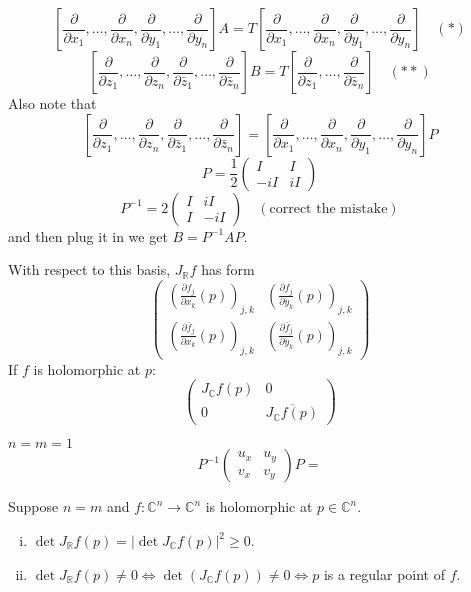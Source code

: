 \documentclass{article}
\begin{document}
$$
\left[ \frac{\partial}{\partial x_1}, \ldots, \frac{\partial}{\partial x_n}, \frac{\partial}{\partial y_1}, \ldots, \frac{\partial}{\partial y_n} \right] A = T \left[ \frac{\partial}{\partial x_1}, \ldots, \frac{\partial}{\partial x_n}, \frac{\partial}{\partial y_1}, \ldots, \frac{\partial}{\partial y_n} \right] \quad (\ast)
$$
$$
\left[ \frac{\partial}{\partial z_1}, \ldots, \frac{\partial}{\partial z_n}, \frac{\partial}{\partial \bar{z}_1}, \ldots, \frac{\partial}{\partial \bar{z}_n} \right] B = T \left[ \frac{\partial}{\partial z_1}, \ldots, \frac{\partial}{\partial \bar{z}_n} \right] \quad (\ast\ast)
$$
Also note that
$$
\left[ \frac{\partial}{\partial z_1}, \ldots, \frac{\partial}{\partial z_n}, \frac{\partial}{\partial \bar{z}_1}, \ldots, \frac{\partial}{\partial \bar{z}_n} \right] = \left[ \frac{\partial}{\partial x_1}, \ldots, \frac{\partial}{\partial x_n}, \frac{\partial}{\partial y_1}, \ldots, \frac{\partial}{\partial y_n} \right] P
$$
$$
P = \frac{1}{2} \begin{pmatrix}
I & I \\
-iI & iI
\end{pmatrix}
$$
$$
P^{-1} = 2 \begin{pmatrix}
I & iI \\
I & -iI
\end{pmatrix} \quad (\text{correct the mistake})
$$
and then plug it in we get $B = P^{-1} A P$.

With respect to this basis, $J_{\mathbb{R}} f$ has form
$$
\begin{pmatrix}
\left( \frac{\partial f_j}{\partial x_k} (p) \right)_{j, k} & \left( \frac{\partial f_j}{\partial y_k} (p) \right)_{j, k} \\
\left( \frac{\partial \bar{f}_j}{\partial x_k} (p) \right)_{j, k} & \left( \frac{\partial \bar{f}_j}{\partial y_k} (p) \right)_{j, k}
\end{pmatrix}
$$
If $f$ is holomorphic at $p$:
$$
\begin{pmatrix}
J_{\mathbb{C}} f(p) & 0 \\
0 & \overline{J_{\mathbb{C}} f(p)}
\end{pmatrix}
$$

\begin{example}
$n=m=1$
$$
P^{-1} \begin{pmatrix} u_x & u_y \\ v_x & v_y \end{pmatrix} P =
$$
\end{example}

\begin{lemma}
Suppose $n=m$ and $f: \mathbb{C}^n \to \mathbb{C}^n$ is holomorphic at $p \in \mathbb{C}^n$.
\begin{enumerate}[(i)]
    \item $\det J_{\mathbb{R}} f(p) = | \det J_{\mathbb{C}} f(p) |^2 \ge 0$.
    \item $\det J_{\mathbb{R}} f(p) \ne 0 \iff \det (J_{\mathbb{C}} f(p)) \ne 0 \iff p$ is a regular point of $f$.
\end{enumerate}
\end{lemma}
\end{document}
